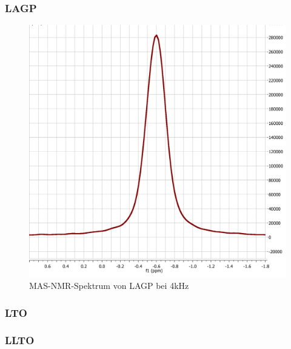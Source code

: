 \documentclass[a4paper, 11pt, headsepline,footsepline,twoside,abstract]{scrbook}
\begin{document}
\subsubsection{LAGP}
\begin{figure}
	\centering
	\includegraphics[width=1.0\columnwidth]{images/LAGP.png}
	\caption{MAS-NMR-Spektrum von LAGP bei 4kHz}
	\label{nmr_mas_LATP2}
\end{figure}
\subsubsection{LTO}
\subsubsection{LLTO}
\end{document}

